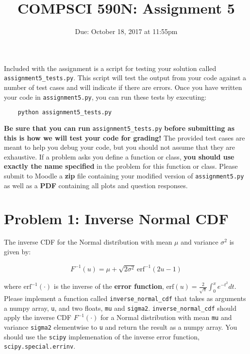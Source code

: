 \documentclass[11pt]{article} %
\title{COMPSCI 590N: Assignment 5}
\date{Due: October 18, 2017 at 11:55pm}
\begin{document}
\thispagestyle{empty}
\pagestyle{empty}

\maketitle
Included with the assignment is a script for testing your solution called \verb|assignment5_tests.py|. This script will test the output from your code against a number of test cases and will indicate if there are errors. Once you have written your code in \verb|assignment5.py|, you can run these tests by executing:

\begin{verbatim}
	python assignment5_tests.py
\end{verbatim}

\textbf{Be sure that you can run} \verb|assignment5_tests.py| \textbf{before submitting as this is how we will test your code for grading!} The provided test cases are meant to help you debug your code, but you should not assume that they are exhaustive. If a problem asks you define a function or class, \textbf{you should use exactly the name specified} in the problem for this function or class. Please submit to Moodle a \textbf{zip} file containing your modified version of \verb|assignment5.py| as well as a \textbf{PDF} containing all plots and question responses.

\section*{Problem 1: Inverse Normal CDF}
The inverse CDF for the Normal distribution with mean $\mu$ and variance $\sigma^2$ is given by:

\begin{align}
	F^{-1}(u) = \mu + \sqrt{2\sigma^2}\,\text{erf}^{-1}(2u - 1)
\end{align}

where $\text{erf}^{-1}(\cdot)$ is the inverse of the \textbf{error function}, $\text{erf}(u) = \frac{2}{\sqrt{\pi}}\int_0^x e^{-t^2} dt$. Please implement a function called \verb|inverse_normal_cdf| that takes as arguments a numpy array, \verb|u|, and two floats, \verb|mu| and \verb|sigma2|. \verb|inverse_normal_cdf| should apply the inverse CDF $F^{-1}(\cdot)$ for a Normal distribution with mean \verb|mu| and variance \verb|sigma2| elementwise to \verb|u| and return the result as a numpy array. You should use the \verb|scipy| implemenation of the inverse error function, \verb|scipy.special.errinv|.
\end{document}
